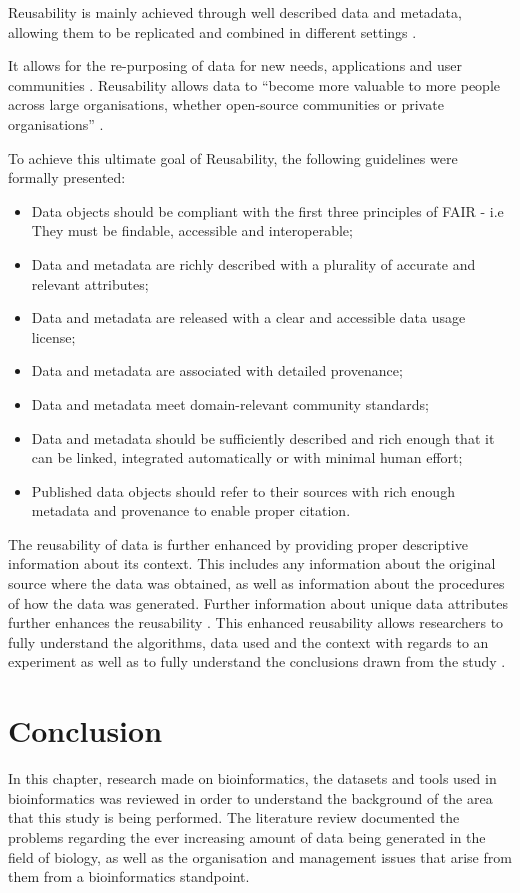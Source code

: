 \documentclass{cisfyp}
\begin{document}
Reusability is mainly achieved through well described data and metadata, allowing them to be replicated and combined in different settings \cite{gofair}.

It allows for the re-purposing of data for new needs, applications and user communities \cite{Wise2019}. Reusability allows data to ``become more valuable to more people across large organisations, whether open-source communities or private organisations'' \cite{Wise2019}.

To achieve this ultimate goal of Reusability, the following guidelines were formally presented: \cite{Wilkinson2016}
\begin{itemize}
	\item Data objects should be compliant with the first three principles of FAIR - i.e They must be findable, accessible and interoperable;
	\item Data and metadata are richly described with a plurality of accurate and relevant attributes;
	\item Data and metadata are released with a clear and accessible data usage license;
	\item Data and metadata are associated with detailed provenance;
	\item Data and metadata meet domain-relevant community standards;
	\item Data and metadata should be sufficiently described and rich enough that it can be linked, integrated automatically or with minimal human effort;
	\item Published data objects should refer to their sources with rich enough metadata and provenance to enable proper citation.
\end{itemize}

The reusability of data is further enhanced by providing proper descriptive information about its context. This includes any information about the original source where the data was obtained, as well as information about the procedures of how the data was generated. Further information about unique data attributes further enhances the reusability \cite{Wittig2017}. This enhanced reusability allows researchers to fully understand the algorithms, data used and the context with regards to an experiment as well as to fully understand the conclusions drawn from the study \cite{taylor2008}.

\section{Conclusion}
In this chapter, research made on bioinformatics, the datasets and tools used in bioinformatics was reviewed in order to understand the background of the area that this study is being performed. The literature review documented the problems regarding the ever increasing amount of data being generated in the field of biology, as well as the organisation and management issues that arise from them from a bioinformatics standpoint.
\end{document}
